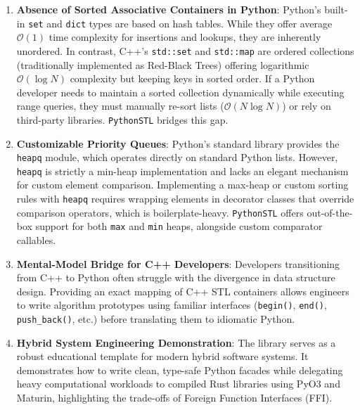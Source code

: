 \documentclass[11pt,a4paper]{article}
\begin{document}
\begin{enumerate}
    \item \textbf{Absence of Sorted Associative Containers in Python}: 
    Python's built-in \texttt{set} and \texttt{dict} types are based on hash tables. While they offer average $\mathcal{O}(1)$ time complexity for insertions and lookups, they are inherently unordered. In contrast, C++'s \texttt{std::set} and \texttt{std::map} are ordered collections (traditionally implemented as Red-Black Trees) offering logarithmic $\mathcal{O}(\log N)$ complexity but keeping keys in sorted order. If a Python developer needs to maintain a sorted collection dynamically while executing range queries, they must manually re-sort lists ($\mathcal{O}(N \log N)$) or rely on third-party libraries. \texttt{PythonSTL} bridges this gap.
    
    \item \textbf{Customizable Priority Queues}:
    Python's standard library provides the \texttt{heapq} module, which operates directly on standard Python lists. However, \texttt{heapq} is strictly a min-heap implementation and lacks an elegant mechanism for custom element comparison. Implementing a max-heap or custom sorting rules with \texttt{heapq} requires wrapping elements in decorator classes that override comparison operators, which is boilerplate-heavy. \texttt{PythonSTL} offers out-of-the-box support for both \texttt{max} and \texttt{min} heaps, alongside custom comparator callables.
    
    \item \textbf{Mental-Model Bridge for C++ Developers}:
    Developers transitioning from C++ to Python often struggle with the divergence in data structure design. Providing an exact mapping of C++ STL containers allows engineers to write algorithm prototypes using familiar interfaces (\texttt{begin()}, \texttt{end()}, \texttt{push\_back()}, etc.) before translating them to idiomatic Python.
    
    \item \textbf{Hybrid System Engineering Demonstration}:
    The library serves as a robust educational template for modern hybrid software systems. It demonstrates how to write clean, type-safe Python facades while delegating heavy computational workloads to compiled Rust libraries using PyO3 and Maturin, highlighting the trade-offs of Foreign Function Interfaces (FFI).
\end{enumerate}

\newpage
\end{document}
